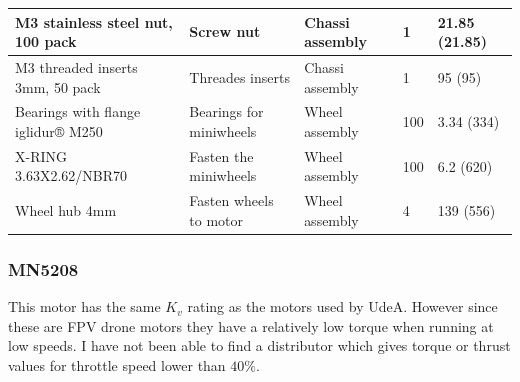 \documentclass[a4paper,8pt]{article}
\begin{document}
\begin{small}
\begin{longtable}{|p{3cm}|p{3cm}|p{3cm}|p{1cm}|p{3cm}| }
      M3 stainless steel nut, 100 pack & Screw nut & Chassi assembly & 1 & 21.85 (21.85) \\ \hline
      M3 threaded inserts 3mm, 50 pack & Threades inserts & Chassi assembly & 1 & 95 (95) \\ \hline
      Bearings with flange iglidur® M250 & Bearings for miniwheels & Wheel assembly & 100 & 3.34 (334) \\ \hline
      X-RING 3.63X2.62/NBR70 & Fasten the miniwheels & Wheel assembly & 100 & 6.2 (620) \\ \hline
      Wheel hub 4mm & Fasten wheels to motor & Wheel assembly & 4 & 139 (556) \\ \hline
    \end{longtable}
  \end{small}
  \subsubsection{MN5208}

  This motor has the same \(K_v\) rating as the motors used by UdeA. However since these are FPV drone motors they have a relatively low torque when running at low speeds. I have not been able to find a distributor which gives torque or thrust values for throttle speed lower than \(40\%\).
\end{document}
